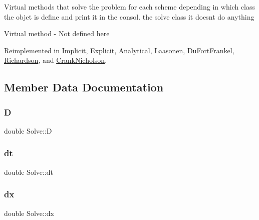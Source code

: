 Virtual methods that solve the problem for each scheme depending in which class the objet is define and print it in the consol.  the solve class it doesn\textquotesingle{}t do anything

Virtual method -\/ Not defined here 

Reimplemented in \hyperlink{class_implicit_a027adb4276376991f75fcffbd34740b3}{Implicit}, \hyperlink{class_explicit_ac99aa17bfd95f66b33e5c0ecf0e53785}{Explicit}, \hyperlink{class_analytical_a8fe1d5769bb516115a31719222eb9ae5}{Analytical}, \hyperlink{class_laasonen_aaa49ab7d15fbfef94a57a0e89977d1c6}{Laasonen}, \hyperlink{class_du_fort_frankel_a73204223c7ace1e3f95e5d89d02c5208}{Du\+Fort\+Frankel}, \hyperlink{class_richardson_ab8dd2ff0e58c11092fead4d45a4f5c64}{Richardson}, and \hyperlink{class_crank_nicholson_a999d04c6ef97b0794f66584f9192dbee}{Crank\+Nicholson}.



\subsection{Member Data Documentation}
\mbox{\label{class_solve_ab6b73352e9bca73bad1b133fc84f008c}} 
\subsubsection{\texorpdfstring{D}{D}}
{\footnotesize\ttfamily double Solve\+::D}

\mbox{\label{class_solve_ac1befb9c006f895fb0517e19c412ca57}} 
\subsubsection{\texorpdfstring{dt}{dt}}
{\footnotesize\ttfamily double Solve\+::dt}

\mbox{\label{class_solve_a21b9b8118f508e079f066d2ce2816dd1}} 
\subsubsection{\texorpdfstring{dx}{dx}}
{\footnotesize\ttfamily double Solve\+::dx}

\mbox{\label{class_solve_a95de020d455d886e667b8307d7efed55}} 
